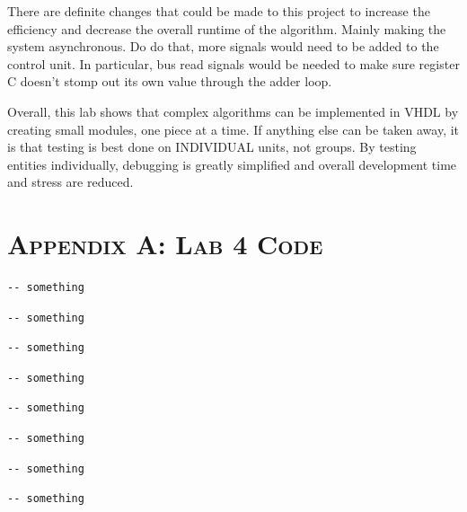 \documentclass[11pt]{report}
\begin{document}
\begin{spacing}{1.5}
There are definite changes that could be made to this project to increase the efficiency and decrease the overall runtime of the algorithm.  Mainly making the system asynchronous.  Do do that, more signals would need to be added to the control unit.  In particular, bus read signals would be needed to make sure register C doesn't stomp out its own value through the adder loop.

Overall, this lab shows that complex algorithms can be implemented in VHDL by creating small modules, one piece at a time.  If anything else can be taken away, it is that testing is best done on INDIVIDUAL units, not groups.  By testing entities individually, debugging is greatly simplified and overall development time and stress are reduced.



{}

\clearpage

\chapter*{\scshape Appendix A: Lab 4 Code}
\label{app:a}

\vspace{15px}
\begin{lstlisting}
-- something
\end{lstlisting}
\clearpage
\vspace{15px}
\begin{lstlisting}
-- something
\end{lstlisting}
\clearpage
\vspace{15px}
\begin{lstlisting}
-- something
\end{lstlisting}
\clearpage
\vspace{15px}
\begin{lstlisting}
-- something
\end{lstlisting}
\clearpage
\vspace{15px}
\begin{lstlisting}
-- something
\end{lstlisting}
\clearpage
\vspace{15px}
\begin{lstlisting}
-- something
\end{lstlisting}
\clearpage
\vspace{15px}
\begin{lstlisting}
-- something
\end{lstlisting}
\clearpage
\vspace{15px}
\begin{lstlisting}
-- something
\end{lstlisting}


\end{spacing}
\end{document}
